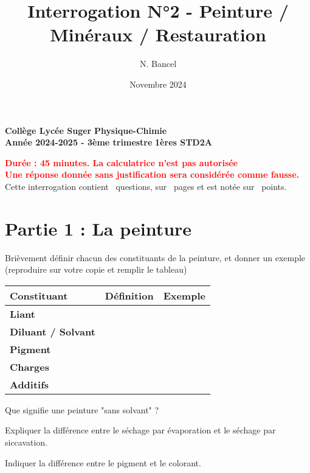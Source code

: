 \documentclass[addpoints]{exam}
\title{Interrogation N°2 - Peinture / Minéraux / Restauration}
\author{N. Bancel}
\date{Novembre 2024}
\begin{document}
\textbf{Collège Lycée Suger}
\hfill
\textbf{Physique-Chimie} \\

\textbf{Année 2024-2025 - 3ème trimestre}
\hfill
\textbf{1ères STD2A} \par

{\let\newpage\relax\maketitle}

\begin{center}
\textbf{\textcolor{red}{Durée : 45 minutes. La calculatrice n'est pas autorisée}} \\
\textbf{\textcolor{red}{Une réponse donnée sans justification sera considérée comme fausse.}} \\
Cette interrogation contient \numquestions\ questions, sur \numpages\ pages et est notée sur \numpoints\ points. 
\end{center}

\section{Partie 1 : La peinture}

\begin{questions}

  \question[4] Brièvement définir chacun des constituants de la peinture, et donner un exemple (reproduire sur votre copie et remplir le tableau)

  \begin{center}
    \begin{tabular}{|>{\bfseries}l|p{7cm}|p{4cm}|}
    \hline
    Constituant & Définition & Exemple \\
    \hline
    Liant &  &  \\
    \hline
    Diluant / Solvant &  &  \\
    \hline
    Pigment & &  \\
    \hline
    Charges &  &  \\
    \hline
    Additifs &  &  \\
    \hline
    \end{tabular}
    \end{center}

  
\question[1] Que signifie une peinture "sans solvant" ?
  
\question[1] Expliquer la différence entre le séchage par évaporation et le séchage par siccavation.  
  
\question[2] Indiquer la différence entre le pigment et le colorant.

  \end{questions}
\end{document}
